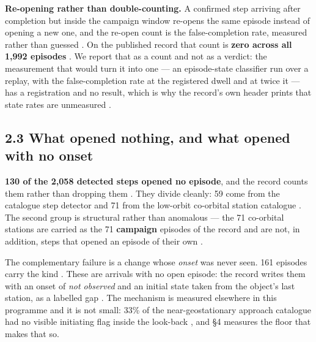 \documentclass[11pt]{article}
\begin{document}
\textbf{Re-opening rather than double-counting.} A confirmed step arriving after completion but inside the campaign window re-opens the same episode instead of opening a new one, and the re-open count is the false-completion rate, measured rather than guessed%
. On the published record that count is \textbf{zero across all 1,992 episodes}%
. We report that as a count and not as a verdict: the measurement that would turn it into one --- an episode-state classifier run over a replay, with the false-completion rate at the registered dwell and at twice it --- has a registration and no result, which is why the record's own header prints that state rates are unmeasured%
.

\subsection*{2.3 What opened nothing, and what opened with no onset}

\textbf{130 of the 2,058 detected steps opened no episode}, and the record counts them rather than dropping them%
. They divide cleanly: 59 come from the catalogue step detector and 71 from the low-orbit co-orbital station catalogue%
. The second group is structural rather than anomalous --- the 71 co-orbital stations are carried as the 71 \textbf{campaign} episodes of the record and are not, in addition, steps that opened an episode of their own%
.

The complementary failure is a change whose \emph{onset} was never seen. 161 episodes carry the kind %
. These are arrivals with no open episode: the record writes them with an onset of \emph{not observed} and an initial state taken from the object's last station, as a labelled gap%
. The mechanism is measured elsewhere in this programme and it is not small: 33\% of the near-geostationary approach catalogue had no visible initiating flag inside the look-back%
, and \S{}4 measures the floor that makes that so.
\end{document}
